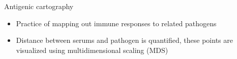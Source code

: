\documentclass{beamer}
\begin{document}
\begin{frame}
\begin{columns}
\begin{column}{0.5\textwidth}
\begin{figure}
            \end{figure}
        \end{column}
    \end{columns}
    \centering
    \vfill
    \tiny{\cite{gogDynamicsSelectionManystrain2002}}

\end{frame}

\begin{frame}{Antigenic cartography }
    \begin{itemize}
        \item Practice of mapping out immune responses to related pathogens
        \item Distance between serums and pathogen is quantified, these points are visualized using multidimensional scaling (MDS)
    \end{itemize}
\end{frame}
\end{document}
